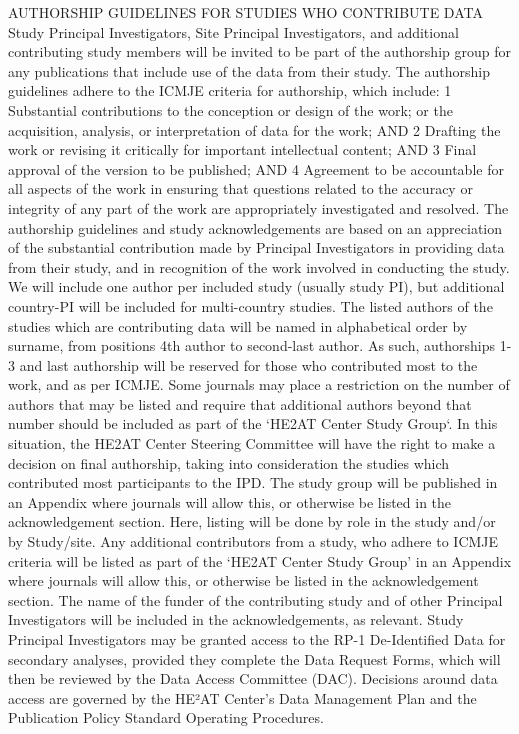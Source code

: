 \documentclass[12pt,letterpaper]{article}
\begin{document}
AUTHORSHIP GUIDELINES FOR STUDIES WHO CONTRIBUTE DATA  Study Principal Investigators, Site Principal Investigators, and additional contributing study members will be invited to be part of the authorship group for any publications that include use of the data from their study.  The authorship guidelines adhere to the ICMJE criteria for authorship, which include:   1	Substantial contributions to the conception or design of the work; or the acquisition, analysis, or interpretation of data for the work; AND  2	Drafting the work or revising it critically for important intellectual content; AND  3	Final approval of the version to be published; AND  4	Agreement to be accountable for all aspects of the work in ensuring that questions related to the accuracy or integrity of any part of the work are appropriately investigated and resolved.  The authorship guidelines and study acknowledgements are based on an appreciation of the substantial contribution made by Principal Investigators in providing data from their study, and in recognition of the work involved in conducting the study.  We will include one author per included study (usually study PI), but additional country-PI will be included for multi-country studies. The listed authors of the studies which are contributing data will be named in alphabetical order by surname, from positions 4th author to second-last author. As such, authorships 1-3 and last authorship will be reserved for those who contributed most to the work, and as per ICMJE.  Some journals may place a restriction on the number of authors that may be listed and require that additional authors beyond that number should be included as part of the ‘HE2AT Center Study Group‘. In this situation, the HE2AT Center Steering Committee will have the right to make a decision on final authorship, taking into consideration the studies which contributed most participants to the IPD.  The study group will be published in an Appendix where journals will allow this, or otherwise be listed in the acknowledgement section. Here, listing will be done by role in the study and/or by Study/site. Any additional contributors from a study, who adhere to ICMJE criteria will be listed as part of the ‘HE2AT Center Study Group’ in an Appendix where journals will allow this, or otherwise be listed in the acknowledgement section.  The name of the funder of the contributing study and of other Principal Investigators will be included in the acknowledgements, as relevant.    Study Principal Investigators may be granted access to the RP-1 De-Identified Data for secondary analyses, provided they complete the Data Request Forms, which will then be reviewed by the Data Access Committee (DAC). Decisions around data access are governed by the HE²AT Center’s Data Management Plan and the Publication Policy Standard Operating Procedures. 
\end{document}
